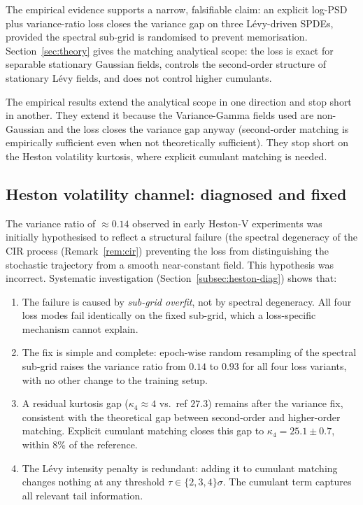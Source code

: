 \documentclass[review,12pt]{elsarticle}
\begin{document}
The empirical evidence supports a narrow, falsifiable claim: an
explicit log-PSD plus variance-ratio loss closes the variance gap
on three L\'evy-driven SPDEs, provided the spectral sub-grid is
randomised to prevent memorisation. Section~\ref{sec:theory} gives
the matching analytical scope: the loss is exact for separable
stationary Gaussian fields, controls the second-order structure of
stationary L\'evy fields, and does not control higher cumulants.

The empirical results extend the analytical scope in one direction
and stop short in another. They extend it because the
Variance-Gamma fields used are non-Gaussian and the loss closes
the variance gap anyway (second-order matching is empirically
sufficient even when not theoretically sufficient). They stop
short on the Heston volatility kurtosis, where explicit cumulant
matching is needed.

\subsection{Heston volatility channel: diagnosed and fixed}

The variance ratio of \(\approx 0.14\) observed in early Heston-V
experiments was initially hypothesised to reflect a structural
failure (the spectral degeneracy of the CIR process
(Remark~\ref{rem:cir}) preventing the loss from distinguishing
the stochastic trajectory from a smooth near-constant field. This
hypothesis was incorrect. Systematic investigation
(Section~\ref{subsec:heston-diag}) shows that:

\begin{enumerate}
\item The failure is caused by \emph{sub-grid overfit}, not by
spectral degeneracy. All four loss modes fail identically on the
fixed sub-grid, which a loss-specific mechanism cannot explain.

\item The fix is simple and complete: epoch-wise random resampling
of the spectral sub-grid raises the variance ratio from
\(0.14\) to \(0.93\) for all four loss variants, with no other
change to the training setup.

\item A residual kurtosis gap (\(\kappa_4 \approx 4\) vs.\ ref
\(27.3\)) remains after the variance fix, consistent with the
theoretical gap between second-order and higher-order matching.
Explicit cumulant matching closes this gap to
\(\kappa_4 = 25.1 \pm 0.7\), within 8\% of the reference.

\item The L\'evy intensity penalty is redundant: adding it to
cumulant matching changes nothing at any threshold
\(\tau \in \{2, 3, 4\}\sigma\). The cumulant term captures all
relevant tail information.
\end{enumerate}
\end{document}
